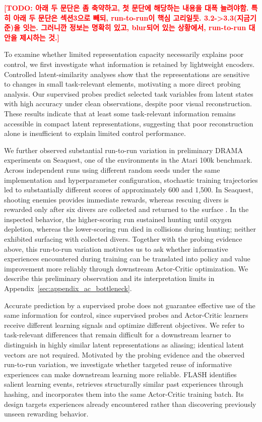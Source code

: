 \documentclass{article} %
\newcommand{\todo}[1]{\textcolor{red}{\textbf{[TODO: #1]}}}
\begin{document}
\todo{아래 두 문단은 좀 축약하고, 첫 문단에 해당하는 내용을 대폭 늘려야함. 특히 아래 두 문단은 섹션3으로 빼되, run-to-run이 핵심 고리일듯. 3.2->3.3(지금기준)을 잇는. 그러니깐 정보는 명확히 있고, blur되어 있는 상황에서, run-to-run 대안을 제시하는 것.}

To examine whether limited representation capacity necessarily explains poor control, we first investigate what information is retained by lightweight encoders. Controlled latent-similarity analyses show that the representations are sensitive to changes in small task-relevant elements, motivating a more direct probing analysis. Our supervised probes predict selected task variables from latent states with high accuracy under clean observations, despite poor visual reconstruction. These results indicate that at least some task-relevant information remains accessible in compact latent representations, suggesting that poor reconstruction alone is insufficient to explain limited control performance.

We further observed substantial run-to-run variation in preliminary DRAMA \citep{wang2025drama} experiments on Seaquest, one of the environments in the Atari 100k benchmark. Across independent runs using different random seeds under the same implementation and hyperparameter configuration, stochastic training trajectories led to substantially different scores of approximately 600 and 1,500. In Seaquest, shooting enemies provides immediate rewards, whereas rescuing divers is rewarded only after six divers are collected and returned to the surface \citep{pmlr-v48-zahavy16}. In the inspected behavior, the higher-scoring run sustained hunting until oxygen depletion, whereas the lower-scoring run died in collisions during hunting; neither exhibited surfacing with collected divers. Together with the probing evidence above, this run-to-run variation motivates us to ask whether informative experiences encountered during training can be translated into policy and value improvement more reliably through downstream Actor-Critic optimization. We describe this preliminary observation and its interpretation limits in Appendix~\ref{sec:appendix_ac_bottleneck}.

Accurate prediction by a supervised probe does not guarantee effective use of the same information for control, since supervised probes and Actor-Critic learners receive different learning signals and optimize different objectives. We refer to task-relevant differences that remain difficult for a downstream learner to distinguish in highly similar latent representations as aliasing; identical latent vectors are not required. Motivated by the probing evidence and the observed run-to-run variation, we investigate whether targeted reuse of informative experiences can make downstream learning more reliable. FLASH identifies salient learning events, retrieves structurally similar past experiences through hashing, and incorporates them into the same Actor-Critic training batch. Its design targets experiences already encountered rather than discovering previously unseen rewarding behavior.
\end{document}

